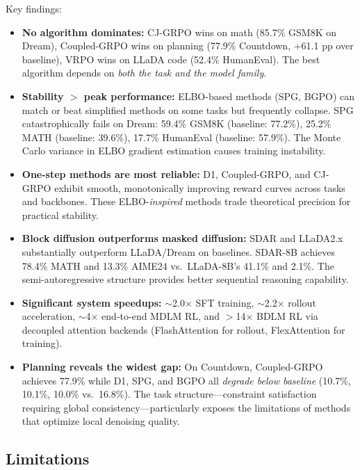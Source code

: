 \documentclass[11pt]{article}
\begin{document}
Key findings:

\begin{itemize}
    \item \textbf{No algorithm dominates:} CJ-GRPO wins on math (85.7\% GSM8K on Dream), Coupled-GRPO wins on planning (77.9\% Countdown, +61.1 pp over baseline), VRPO wins on LLaDA code (52.4\% HumanEval). The best algorithm depends on \textit{both the task and the model family}.

    \item \textbf{Stability $>$ peak performance:} ELBO-based methods (SPG, BGPO) can match or beat simplified methods on some tasks but frequently collapse. SPG catastrophically fails on Dream: 59.4\% GSM8K (baseline: 77.2\%), 25.2\% MATH (baseline: 39.6\%), 17.7\% HumanEval (baseline: 57.9\%). The Monte Carlo variance in ELBO gradient estimation causes training instability.

    \item \textbf{One-step methods are most reliable:} D1, Coupled-GRPO, and CJ-GRPO exhibit smooth, monotonically improving reward curves across tasks and backbones. These ELBO-\textit{inspired} methods trade theoretical precision for practical stability.

    \item \textbf{Block diffusion outperforms masked diffusion:} SDAR and LLaDA2.x substantially outperform LLaDA/Dream on baselines. SDAR-8B achieves 78.4\% MATH and 13.3\% AIME24 vs.\ LLaDA-8B's 41.1\% and 2.1\%. The semi-autoregressive structure provides better sequential reasoning capability.

    \item \textbf{Significant system speedups:} $\sim$2.0$\times$ SFT training, $\sim$2.2$\times$ rollout acceleration, $\sim$4$\times$ end-to-end MDLM RL, and $>$14$\times$ BDLM RL via decoupled attention backends (FlashAttention for rollout, FlexAttention for training).

    \item \textbf{Planning reveals the widest gap:} On Countdown, Coupled-GRPO achieves 77.9\% while D1, SPG, and BGPO all \textit{degrade below baseline} (10.7\%, 10.1\%, 10.0\% vs.\ 16.8\%). The task structure---constraint satisfaction requiring global consistency---particularly exposes the limitations of methods that optimize local denoising quality.
\end{itemize}

\subsection{Limitations}
\end{document}
